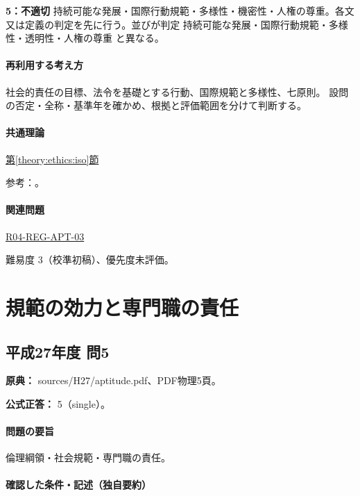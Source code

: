 \noindent\textbf{5：不適切} 持続可能な発展・国際行動規範・多様性・機密性・人権の尊重。各文又は定義の判定を先に行う。並びが判定 持続可能な発展・国際行動規範・多様性・透明性・人権の尊重 と異なる。\par

\paragraph{再利用する考え方} 社会的責任の目標、法令を基礎とする行動、国際規範と多様性、七原則。 設問の否定・全称・基準年を確かめ、根拠と評価範囲を分けて判断する。

\paragraph{共通理論} \hyperref[theory:ethics:iso]{第\ref*{theory:ethics:iso}節}

\par 参考：\cite{iso26000,eth54_iso_brochure}。

\paragraph{関連問題} \hyperref[q:r04-reg-apt-03]{R04-REG-APT-03}

\par 難易度 3（校準初稿）、優先度未評価。

\section{規範の効力と専門職の責任}

\subsection{平成27年度 問5}
\label{q:h27-reg-apt-05}

\noindent\textbf{原典：} sources/H27/aptitude.pdf、PDF物理5頁。

\textbf{公式正答：} 5（single）。

\paragraph{問題の要旨} 倫理綱領・社会規範・専門職の責任。

\paragraph{確認した条件・記述（独自要約）}\mbox{}\par


